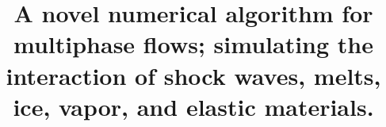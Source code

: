 \documentclass[preprint,12pt]{Definitions/elsarticle}
\begin{document}
\begin{frontmatter}



\title{A novel numerical algorithm for multiphase flows; simulating the
	interaction of shock waves, melts, ice, vapor, and elastic materials.}


\author{} %



\end{frontmatter}
\end{document}
